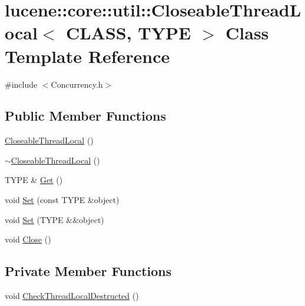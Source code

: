 \hypertarget{classlucene_1_1core_1_1util_1_1CloseableThreadLocal}{}\section{lucene\+:\+:core\+:\+:util\+:\+:Closeable\+Thread\+Local$<$ C\+L\+A\+SS, T\+Y\+PE $>$ Class Template Reference}
\label{classlucene_1_1core_1_1util_1_1CloseableThreadLocal}


{\ttfamily \#include $<$Concurrency.\+h$>$}

\subsection*{Public Member Functions}
\begin{DoxyCompactItemize}
\item 
\mbox{\hyperlink{classlucene_1_1core_1_1util_1_1CloseableThreadLocal_a9f142d18bd6ce2cedd4e546c1f0a4f48}{Closeable\+Thread\+Local}} ()
\item 
\mbox{\hyperlink{classlucene_1_1core_1_1util_1_1CloseableThreadLocal_a351cc693f801a08cdfc1460c08b46dca}{$\sim$\+Closeable\+Thread\+Local}} ()
\item 
T\+Y\+PE \& \mbox{\hyperlink{classlucene_1_1core_1_1util_1_1CloseableThreadLocal_a3d4ba44072bfd8fb6e87ccc214349ace}{Get}} ()
\item 
void \mbox{\hyperlink{classlucene_1_1core_1_1util_1_1CloseableThreadLocal_af6068e7d6c7de9e5f0a9e23811227e8f}{Set}} (const T\+Y\+PE \&object)
\item 
void \mbox{\hyperlink{classlucene_1_1core_1_1util_1_1CloseableThreadLocal_a7d6993982d3b1daeae39d75feb926b34}{Set}} (T\+Y\+PE \&\&object)
\item 
void \mbox{\hyperlink{classlucene_1_1core_1_1util_1_1CloseableThreadLocal_a3f2edc7d9c2a0ce9cf16632527553ee4}{Close}} ()
\end{DoxyCompactItemize}
\subsection*{Private Member Functions}
\begin{DoxyCompactItemize}
\item 
void \mbox{\hyperlink{classlucene_1_1core_1_1util_1_1CloseableThreadLocal_a489ab727ebcf95af41ec59265b5804d8}{Check\+Thread\+Local\+Destructed}} ()
\end{DoxyCompactItemize}
